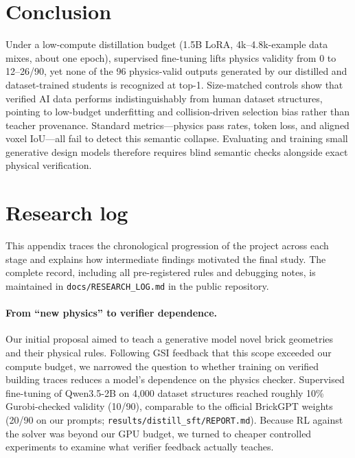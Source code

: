 \documentclass{article}
\begin{document}
\section{Conclusion}
\label{sec:conclusion}
Under a low-compute distillation budget (1.5B LoRA, 4k--4.8k-example data mixes, about one epoch), supervised fine-tuning lifts physics validity from 0 to 12--26/90, yet none of the 96 physics-valid outputs generated by our distilled and dataset-trained students is recognized at top-1. Size-matched controls show that verified AI data performs indistinguishably from human dataset structures, pointing to low-budget underfitting and collision-driven selection bias rather than teacher provenance. Standard metrics---physics pass rates, token loss, and aligned voxel IoU---all fail to detect this semantic collapse. Evaluating and training small generative design models therefore requires blind semantic checks alongside exact physical verification.




\appendix
\section{Research log}
\label{app:log}
This appendix traces the chronological progression of the project across each stage and explains how intermediate findings motivated the final study. The complete record, including all pre-registered rules and debugging notes, is maintained in \texttt{docs/RESEARCH\_LOG.md} in the public repository.

\paragraph{From ``new physics'' to verifier dependence.}
Our initial proposal aimed to teach a generative model novel brick geometries and their physical rules. Following GSI feedback that this scope exceeded our compute budget, we narrowed the question to whether training on verified building traces reduces a model's dependence on the physics checker. Supervised fine-tuning of Qwen3.5-2B on 4{,}000 dataset structures reached roughly 10\% Gurobi-checked validity (10/90), comparable to the official BrickGPT weights (20/90 on our prompts; \texttt{results/distill\_sft/REPORT.md}). Because RL against the solver was beyond our GPU budget, we turned to cheaper controlled experiments to examine what verifier feedback actually teaches.
\end{document}
